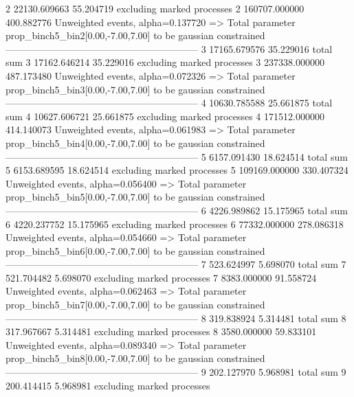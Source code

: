 2          22130.609663    55.204719       excluding marked processes    
2          160707.000000   400.882776      Unweighted events, alpha=0.137720
  => Total parameter prop_binch5_bin2[0.00,-7.00,7.00] to be gaussian constrained
------------------------------------------------------------
3          17165.679576    35.229016       total sum                     
3          17162.646214    35.229016       excluding marked processes    
3          237338.000000   487.173480      Unweighted events, alpha=0.072326
  => Total parameter prop_binch5_bin3[0.00,-7.00,7.00] to be gaussian constrained
------------------------------------------------------------
4          10630.785588    25.661875       total sum                     
4          10627.606721    25.661875       excluding marked processes    
4          171512.000000   414.140073      Unweighted events, alpha=0.061983
  => Total parameter prop_binch5_bin4[0.00,-7.00,7.00] to be gaussian constrained
------------------------------------------------------------
5          6157.091430     18.624514       total sum                     
5          6153.689595     18.624514       excluding marked processes    
5          109169.000000   330.407324      Unweighted events, alpha=0.056400
  => Total parameter prop_binch5_bin5[0.00,-7.00,7.00] to be gaussian constrained
------------------------------------------------------------
6          4226.989862     15.175965       total sum                     
6          4220.237752     15.175965       excluding marked processes    
6          77332.000000    278.086318      Unweighted events, alpha=0.054660
  => Total parameter prop_binch5_bin6[0.00,-7.00,7.00] to be gaussian constrained
------------------------------------------------------------
7          523.624997      5.698070        total sum                     
7          521.704482      5.698070        excluding marked processes    
7          8383.000000     91.558724       Unweighted events, alpha=0.062463
  => Total parameter prop_binch5_bin7[0.00,-7.00,7.00] to be gaussian constrained
------------------------------------------------------------
8          319.838924      5.314481        total sum                     
8          317.967667      5.314481        excluding marked processes    
8          3580.000000     59.833101       Unweighted events, alpha=0.089340
  => Total parameter prop_binch5_bin8[0.00,-7.00,7.00] to be gaussian constrained
------------------------------------------------------------
9          202.127970      5.968981        total sum                     
9          200.414415      5.968981        excluding marked processes    

